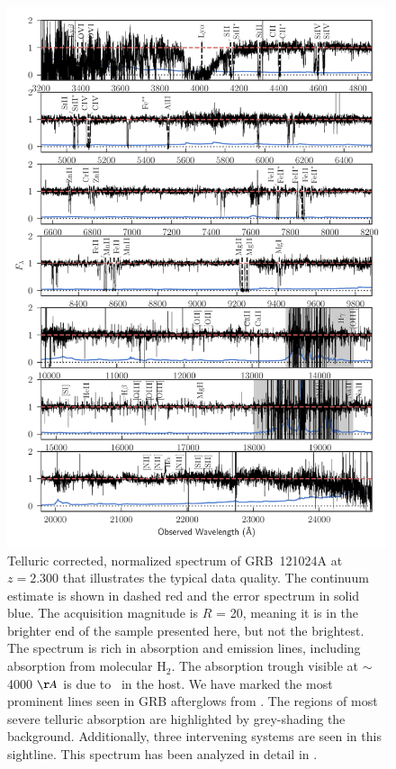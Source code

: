 \documentclass[longauth]{aa}    %
\begin{document}
\begin{figure}
	\centerline{\includegraphics[width=\linewidth]{figures/GRB121024A.pdf}}
\caption{Telluric corrected, normalized spectrum of GRB~121024A at $z = 2.300$
	that illustrates the typical data quality. The continuum estimate is shown in
	dashed red and the error spectrum in solid blue. The acquisition magnitude is
	$R$ = 20, meaning it is in the brighter end of the sample presented here, but
	not the brightest. The spectrum is rich in absorption and emission lines, including
	absorption from molecular $\mathrm{H_2}$. The absorption trough visible at
	$\sim$ 4000 $\AA$ is due to \lya~in the host. We have marked the most prominent
	lines seen in GRB afterglows from \citet{Christensen2011a}. The regions of most
	severe telluric absorption are highlighted by grey-shading the background.
	Additionally, three intervening systems are seen in this sightline. This
	spectrum has been analyzed in detail in \citet{Friis2015}.}
\label{fig:spectrum}
\end{figure}
\end{document}
